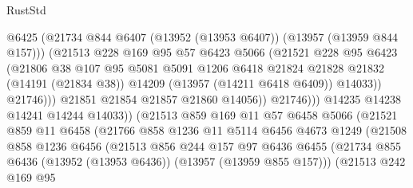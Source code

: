 \begin{lexlean}{RustStd}
\begin{coremodule}
                              @6425
                              (@21734
                                @844
                                @6407
                                (@13952 (@13953 @6407))
                                (@13957 (@13959 @844 @157)))
                              (@21513
                                @228
                                @169
                                @95
                                @57
                                @6423
                                @5066
                                (@21521
                                  @228
                                  @95
                                  @6423
                                  (@21806
                                    @38
                                    @107
                                    @95
                                    @5081
                                    @5091
                                    @1206
                                    @6418
                                    @21824
                                    @21828
                                    @21832
                                    (@14191 (@21834 @38))
                                    @14209
                                    (@13957 (@14211 @6418 @6409))
                                    @14033))
                                @21746)))
                          @21851
                          @21854
                          @21857
                          @21860
                          @14056))
                      @21746)))
                @14235
                @14238
                @14241
                @14244
                @14033))
            (@21513
              @859
              @169
              @11
              @57
              @6458
              @5066
              (@21521
                @859
                @11
                @6458
                (@21766
                  @858
                  @1236
                  @11
                  @5114
                  @6456
                  @4673
                  @1249
                  (@21508
                    @858
                    @1236
                    @6456
                    (@21513
                      @856
                      @244
                      @157
                      @97
                      @6436
                      @6455
                      (@21734 @855 @6436 (@13952 (@13953 @6436)) (@13957 (@13959 @855 @157)))
                      (@21513
                        @242
                        @169
                        @95

\end{coremodule}
\end{lexlean}
